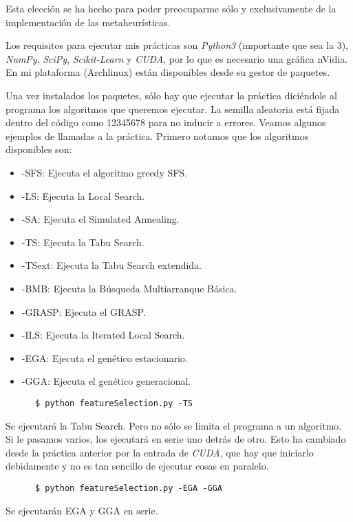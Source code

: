 \documentclass[a4paper, 11pt]{article}
\begin{document}
    Esta elección se ha hecho para poder preocuparme sólo y exclusivamente de la implementación de las metaheurísticas.

    Los requisitos para ejecutar mis prácticas son \emph{Python3} (importante que sea la 3), \emph{NumPy}, \emph{SciPy}, \emph{Scikit-Learn} y \emph{CUDA}, por lo que es necesario una gráfica nVidia. En mi plataforma (Archlinux) están disponibles desde su gestor de paquetes.

    Una vez instalados los paquetes, sólo hay que ejecutar la práctica diciéndole al programa los algoritmos que queremos ejecutar. La semilla aleatoria está fijada dentro del código como 12345678 para no inducir a errores. Veamos algunos ejemplos de llamadas a la práctica. Primero notamos que los algoritmos disponibles son:

    \begin{itemize}
      \item -SFS: Ejecuta el algoritmo greedy SFS.
      \item -LS: Ejecuta la Local Search.
      \item -SA: Ejecuta el Simulated Annealing.
      \item -TS: Ejecuta la Tabu Search.
      \item -TSext: Ejecuta la Tabu Search extendida.
      \item -BMB: Ejecuta la Búsqueda Multiarranque Básica.
      \item -GRASP: Ejecuta el GRASP.
      \item -ILS: Ejecuta la Iterated Local Search.
      \item -EGA: Ejecuta el genético estacionario.
      \item -GGA: Ejecuta el genético generacional.
    \end{itemize}

    \begin{verbatim}
      $ python featureSelection.py -TS
    \end{verbatim}
    Se ejecutará la Tabu Search. Pero no sólo se limita el programa a un algoritmo. Si le pasamos varios, los ejecutará en serie uno detrás de otro. Esto ha cambiado desde la práctica anterior por la entrada de \emph{CUDA}, que hay que iniciarlo debidamente y no es tan sencillo de ejecutar cosas en paralelo.

    \begin{verbatim}
      $ python featureSelection.py -EGA -GGA
    \end{verbatim}
    Se ejecutarán EGA y GGA en serie.
\end{document}
